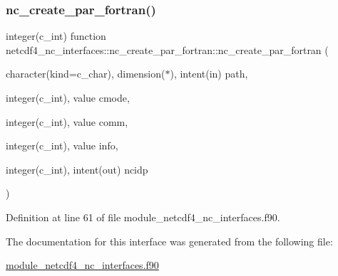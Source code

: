 \subsubsection{\texorpdfstring{nc\+\_\+create\+\_\+par\+\_\+fortran()}{nc\_create\_par\_fortran()}}
{\footnotesize\ttfamily integer(c\+\_\+int) function netcdf4\+\_\+nc\+\_\+interfaces\+::nc\+\_\+create\+\_\+par\+\_\+fortran\+::nc\+\_\+create\+\_\+par\+\_\+fortran (\begin{DoxyParamCaption}\item[{character(kind=c\+\_\+char), dimension($\ast$), intent(in)}]{path,  }\item[{integer(c\+\_\+int), value}]{cmode,  }\item[{integer(c\+\_\+int), value}]{comm,  }\item[{integer(c\+\_\+int), value}]{info,  }\item[{integer(c\+\_\+int), intent(out)}]{ncidp }\end{DoxyParamCaption})}



Definition at line 61 of file module\+\_\+netcdf4\+\_\+nc\+\_\+interfaces.\+f90.



The documentation for this interface was generated from the following file\+:\begin{DoxyCompactItemize}
\item 
\hyperlink{module__netcdf4__nc__interfaces_8f90}{module\+\_\+netcdf4\+\_\+nc\+\_\+interfaces.\+f90}\end{DoxyCompactItemize}
